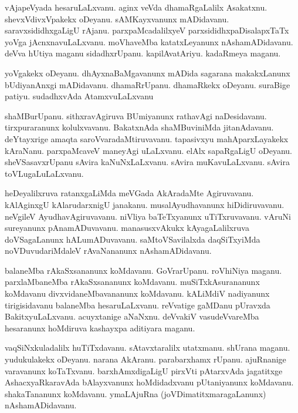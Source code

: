 \documentclass{article}
\begin{document}
\begin{mn}%
vAjapeVyada hesaruLaLxvanu. aginx veVda dhamaRgaLalilx Asakatxnu. shevxVdivxVpakekx oDeyanu. 
sAMKayxvanunx mADidavanu. saravxsididhxgaLigU rAjanu. parxpaMcadalilxyeV parxsididhxpaDisalapxTaTx 
yoVga jAcnxnavuLaLxvanu. moVhaveMba katatxLeyanunx nAshamADidavanu. deVva hUtiya maganu 
sidadhxrUpanu. kapilAvatAriyu. kadaRmeya maganu.
\end{mn}

\begin{mn}%
yoVgakekx oDeyanu. dhAyxnaBaMgavanunx mADida sagarana makakxLanunx bUdiyanAnxgi mADidavanu. 
dhamaRrUpanu. dhamaRkekx oDeyanu. suraBige patiyu. sudadhxvAda AtamxvuLaLxvanu
\end{mn}

\begin{mn}%
shaMBurUpanu. sithxravAgiruva BUmiyanunx rathavAgi naDesidavanu. tirxpuraranunx kolulxvavanu. 
BakatxnAda shaMBuviniMda jitanAdavanu. deYtayxrige amaqta saroVvaradaMtiruvavanu. tapasivxyu 
mahAparxLayakekx kAraNanu. parxpaMcaveV maneyAgi uLaLxvanu. elAlx sapaRgaLigU oDeyanu. 
sheVSasavxrUpanu sAvira kaNuNxLaLxvanu. sAvira muKavuLaLxvanu. sAvira toVLugaLuLaLxvanu.
\end{mn}

\begin{mn}%
heDeyalilxruva ratanxgaLiMda meVGada AkAradaMte Agiruvavanu. kAlAginxgU kAlarudarxnigU janakanu. 
musalAyudhavanunx hiDidiruvavanu. neVgileV AyudhavAgiruvavanu. niVliya baTeTxyanunx uTiTxruvavanu. 
vAruNi sureyanunx pAnamADuvavanu. manasusxvAkukx kAyagaLalilxruva doVSagaLanunx hALumADuvavanu. 
saMtoVSavilalxda daqSiTxyiMda noVDuvudariMdaleV rAvaNananunx nAshamADidavanu.
\end{mn}

\begin{mn}%
balaneMba rAkaSxsananunx koMdavanu. GoVrarUpanu. roVhiNiya maganu. parxlaMbaneMba rAkaSxsananunx 
koMdavanu. muSiTxkAsurananunx koMdavanu divxvidaneMbavananunx koMdavanu. kALiMdiV nadiyanunx 
tirigisidavanu balaneMba hesaruLaLxvanu. reVvatige gaMDanu pUravxda BakitxyuLaLxvanu. acuyxtanige 
aNaNxnu. deVvakiV vasudeVvareMba hesaranunx hoMdiruva kashayxpa aditiyara maganu.
\end{mn}

\begin{mn}%
vaqSiNxkuladalilx huTiTxdavanu. sAtavxtaralilx utatxmanu. shUrana maganu. yudukulakekx oDeyanu. 
narana AkAranu. parabarxhamx rUpanu. ajuRnanige varavanunx koTaTxvanu. barxhAmxdigaLigU pirxVti 
pAtarxvAda jagatitxge AshacxyaRkaravAda bAlayxvanunx hoMdidadxvanu pUtaniyanunx koMdavanu. 
shakaTananunx koMdavanu. ymaLAjuRna (joVDimatitxmaragaLanunx) nAshamADidavanu.
\end{mn}
\end{document}
